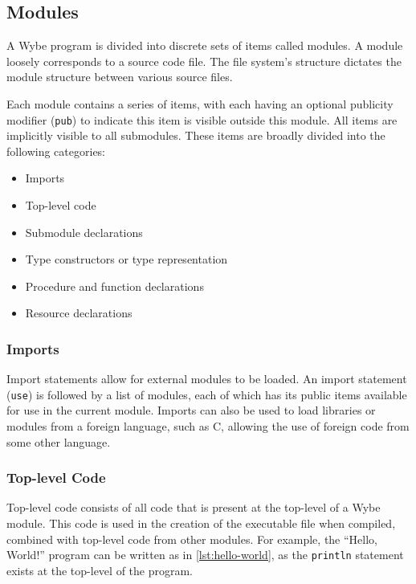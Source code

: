 \subsection{Modules}

A Wybe program is divided into discrete sets of items called modules. A module loosely corresponds to a source code file. The file system's structure dictates the module structure between various source files.

Each module contains a series of items, with each having an optional publicity modifier (\texttt{pub}) to indicate this item is visible outside this module. All items are implicitly visible to all submodules. These items are broadly divided into the following categories:

\begin{itemize}
  \item Imports
  \item Top-level code
  \item Submodule declarations
  \item Type constructors or type representation
  \item Procedure and function declarations
  \item Resource declarations
\end{itemize}

\subsubsection*{Imports}

Import statements allow for external modules to be loaded. An import statement (\texttt{use}) is followed by a list of modules, each of which has its public items available for use in the current module. Imports can also be used to load libraries or modules from a foreign language, such as C, allowing the use of foreign code from some other language.

\subsubsection*{Top-level Code}

Top-level code consists of all code that is present at the top-level of a Wybe module. This code is used in the creation of the executable file when compiled, combined with top-level code from other modules. For example, the ``Hello, World!'' program can be written as in \cref{lst:hello-world}, as the \texttt{println} statement exists at the top-level of the program.

